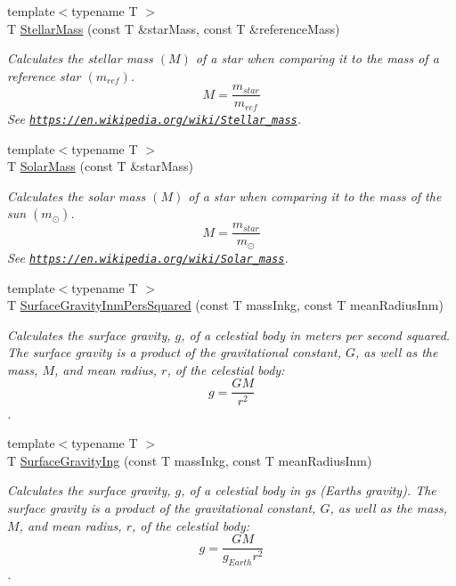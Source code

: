 \begin{DoxyCompactItemize}
{\footnotesize template$<$typename T $>$ }\\T \mbox{\hyperlink{group___e_g_x_phys-_stellar_mass_gabbd6081cd3bfb0153d7470d58f733a61}{Stellar\+Mass}} (const T \&star\+Mass, const T \&reference\+Mass)
\begin{DoxyCompactList}\small\item\em Calculates the stellar mass $(M)$ of a star when comparing it to the mass of a reference star $(m_{ref})$. \[M=\frac{m_{star}}{m_{ref}}\] See \href{https://en.wikipedia.org/wiki/Stellar_mass}{\tt https\+://en.\+wikipedia.\+org/wiki/\+Stellar\+\_\+mass}. \end{DoxyCompactList}\item 
{\footnotesize template$<$typename T $>$ }\\T \mbox{\hyperlink{group___e_g_x_phys-_stellar_mass_gac393d64d586be3dc76ac7a98ac336514}{Solar\+Mass}} (const T \&star\+Mass)
\begin{DoxyCompactList}\small\item\em Calculates the solar mass $(M)$ of a star when comparing it to the mass of the sun $(m_\odot)$. \[M=\frac{m_{star}}{m_\odot}\] See \href{https://en.wikipedia.org/wiki/Solar_mass}{\tt https\+://en.\+wikipedia.\+org/wiki/\+Solar\+\_\+mass}. \end{DoxyCompactList}\item 
{\footnotesize template$<$typename T $>$ }\\T \mbox{\hyperlink{group___e_g_x_phys-_astrophysics-_surface_gravity_gaf7e1f42b674fe8bb2211c40882a7d5b6}{Surface\+Gravity\+Inm\+Pers\+Squared}} (const T mass\+Inkg, const T mean\+Radius\+Inm)
\begin{DoxyCompactList}\small\item\em Calculates the surface gravity, $g$, of a celestial body in meters per second squared. The surface gravity is a product of the gravitational constant, $G$, as well as the mass, $M$, and mean radius, $r$, of the celestial body\+: \[g = \frac{GM}{r^2}\]. \end{DoxyCompactList}\item 
{\footnotesize template$<$typename T $>$ }\\T \mbox{\hyperlink{group___e_g_x_phys-_astrophysics-_surface_gravity_gab5bb479758d72608ef6ada063f6c1a1b}{Surface\+Gravity\+Ing}} (const T mass\+Inkg, const T mean\+Radius\+Inm)
\begin{DoxyCompactList}\small\item\em Calculates the surface gravity, $g$, of a celestial body in gs (Earth\textquotesingle{}s gravity). The surface gravity is a product of the gravitational constant, $G$, as well as the mass, $M$, and mean radius, $r$, of the celestial body\+: \[g = \frac{GM}{g_{Earth}r^2}\]. \end{DoxyCompactList}\item 

\end{DoxyCompactItemize}
